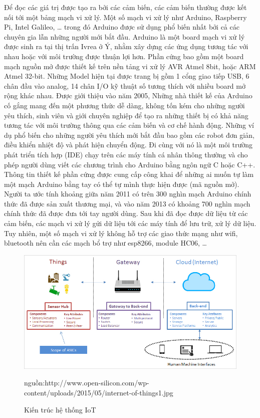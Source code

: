 Để đọc các giá trị được tạo ra bởi các cảm biến, các cảm biến thường được kết nối tới một bảng mạch vi xử lý. Một số mạch vi xử lý như Arduino, Raspberry Pi, Intel Galileo, … trong đó Arduino được sử dụng phổ biến nhất bởi cả các chuyên gia lẫn những người mới bắt đầu. Arduino là một board mạch vi xử lý được sinh ra tại thị trấn Ivrea ở Ý, nhằm xây dựng các ứng dụng tương tác với nhau hoặc với môi trường được thuận lợi hơn. Phần cứng bao gồm một board mạch nguồn mở được thiết kế trên nền tảng vi xử lý AVR Atmel 8bit, hoặc ARM Atmel 32-bit. Những Model hiện tại được trang bị gồm 1 cổng giao tiếp USB, 6 chân đầu vào analog, 14 chân I/O kỹ thuật số tương thích với nhiều board mở rộng khác nhau. Được giới thiệu vào năm 2005, Những nhà thiết kế của Arduino cố gắng mang đến một phương thức dễ dàng, không tốn kém cho những người yêu thích, sinh viên và giới chuyên nghiệp để tạo ra những thiết bị có khả năng tương tác với môi trường thông qua các cảm biến và cơ chế hành động. Những ví dụ phổ biến cho những người yêu thích mới bắt đầu bao gồm các robot đơn giản, điều khiển nhiệt độ và phát hiện chuyển động. Đi cùng với nó là một môi trường phát triển tích hợp (IDE) chạy trên các máy tính cá nhân thông thường và cho phép người dùng viết các chương trình cho Arduino bằng ngôn ngữ C hoặc C++. Thông tin thiết kế phần cứng được cung cấp công khai để những ai muốn tự làm một mạch Arduino bằng tay có thể tự mình thực hiện được (mã nguồn mở). Người ta ước tính khoảng giữa năm 2011 có trên 300 nghìn mạch Arduino chính thức đã được sản xuất thương mại, và vào năm 2013 có khoảng 700 nghìn mạch chính thức đã được đưa tới tay người dùng. 
Sau khi đã đọc được dữ liệu từ các cảm biến, các mạch vi xử lý gửi dữ liệu tới các máy tính để lưu trữ, xử lý dữ liệu. Tuy nhiên, một số mạch vi xử lý không hỗ trợ các giao thức mạng như wifi, bluetooth nên cần các mạch bổ trợ như esp8266, module HC06, …

\clearpage
\begin{figure}[h!]
	\center
	\includegraphics[scale=0.6]{image/internet-of-things1}
	\caption{Kiến trúc hệ thống IoT}
	nguồn:http://www.open-silicon.com/wp-content/uploads/2015/05/internet-of-things1.jpg
	\label{fig:iot}
\end{figure}


